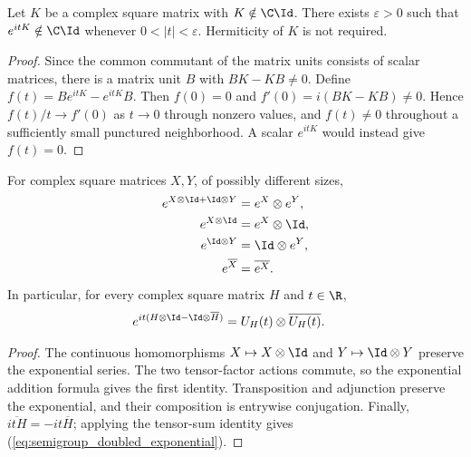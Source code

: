\begin{theorem}
    \label{thm:exponential_nonscalar_near_zero}
    \leanok
    Let $K$ be a complex square matrix with $K\notin\C\Id$.
    There exists $\varepsilon>0$ such that
    $e^{itK}\notin\C\Id$ whenever $0<|t|<\varepsilon$.
    Hermiticity of $K$ is not required.
\end{theorem}
\begin{proof}\leanok
    Since the common commutant of the matrix units consists of scalar
    matrices, there is a matrix unit $B$ with $BK-KB\ne0$.
    Define $f(t)=Be^{itK}-e^{itK}B$. Then $f(0)=0$ and
    $f'(0)=i(BK-KB)\ne0$. Hence $f(t)/t\to f'(0)$ as $t\to0$ through
    nonzero values, and $f(t)\ne0$ throughout a sufficiently small
    punctured neighborhood. A scalar $e^{itK}$ would instead give $f(t)=0$.
\end{proof}

\begin{theorem}
    \label{thm:exponential_kronecker_sum}
    \leanok
    For complex square matrices $X,Y$, of possibly different sizes,
    \begin{align}
        e^{X\otimes\Id+\Id\otimes Y} & =e^X\otimes e^Y,\notag \\
        e^{X\otimes\Id}              & =e^X\otimes\Id,\notag  \\
        e^{\Id\otimes Y}             & =\Id\otimes e^Y,\notag \\
        e^{\overline X}              & =\overline{e^X}.
        \notag
    \end{align}
    In particular, for every complex square matrix $H$ and $t\in\R$,
    \begin{align}
        e^{it(H\otimes\Id-\Id\otimes\overline H)}
         & =U_H(t)\otimes\overline{U_H(t)}.
        \label{eq:semigroup_doubled_exponential}
    \end{align}
\end{theorem}
\begin{proof}\leanok
    The continuous homomorphisms $X\mapsto X\otimes\Id$ and
    $Y\mapsto\Id\otimes Y$ preserve the exponential series.
    The two tensor-factor actions commute, so the exponential addition
    formula gives the first identity. Transposition and adjunction
    preserve the exponential, and their composition is entrywise
    conjugation. Finally, $\overline{itH}=-it\overline H$; applying
    the tensor-sum identity gives (\ref{eq:semigroup_doubled_exponential}).
\end{proof}

